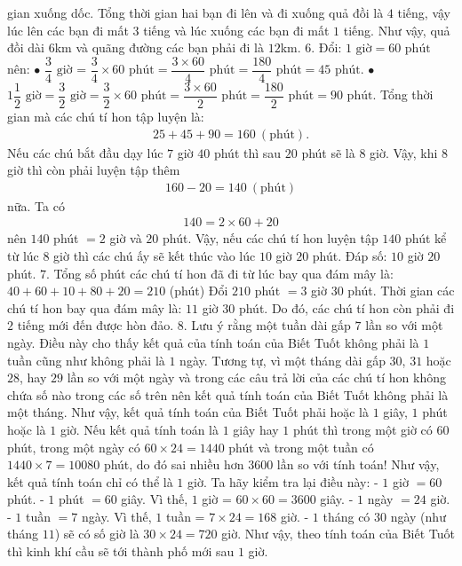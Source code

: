 gian xuống dốc. Tổng thời gian hai bạn đi lên và đi xuống quả đồi là $4$ tiếng, vậy lúc lên các bạn đi mất $3$ tiếng và lúc xuống các bạn đi mất $1$ tiếng.
Như vậy, quả đồi dài 6km và quãng đường các bạn phải đi là $12$km.
\vskip 0.1cm
6. Đổi: $1 \mbox{ giờ} = 60 \mbox{ phút}$ nên: 
\vskip 0.1cm
$\bullet$ $\dfrac{3}{4} \mbox{ giờ}$ = $\dfrac{3}{4}\times 60 \mbox{ phút}= \dfrac{3\times 60}{4}  \mbox{ phút}= \dfrac{180}{4}  \mbox{ phút}= 45 \mbox{ phút}.$ 
\vskip 0.1cm
$\bullet$ $1\dfrac{1}{2} \mbox{ giờ}= \dfrac{3}{2} \mbox{ giờ} = \dfrac{3}{2}\times 60  \mbox{ phút}= \dfrac{3\times 60}{2}  \mbox{ phút}= \dfrac{180}{2}  \mbox{ phút}= 90 \mbox{ phút}.$
\vskip 0.1cm
Tổng thời gian mà các chú tí hon tập luyện là:
\begin{align*}
	25 + 45 + 90= 160 \ (\textrm{phút}).
\end{align*}
Nếu các chú bắt đầu dạy lúc $7$ giờ $40$ phút thì sau $20$ phút sẽ là $8$ giờ. Vậy, khi $8$ giờ thì còn phải luyện tập thêm
\begin{align*}
	160-20=140\ (\textrm{phút})
\end{align*}
nữa. Ta có 
\begin{align*}
	140= 2\times 60 +20
\end{align*}
nên $140$ phút $=2$ giờ và $20$ phút. Vậy, nếu các chú tí hon luyện tập $140$ phút kể từ lúc $8$ giờ thì các chú ấy sẽ kết thúc vào lúc  $10$ giờ $20$ phút.
\vskip 0.1cm
Đáp số: $10$ giờ $20$ phút.
\vskip 0.1cm
$7.$
\vskip 0.1cm
Tổng số phút các chú tí hon đã đi từ lúc bay qua đám mây là:
\vskip 0.1cm
$40 + 60 + 10 + 80 + 20 = 210$ (phút)
\vskip 0.1cm
Đổi $210$ phút  $= 3$ giờ $30$ phút.
\vskip 0.1cm
Thời gian các chú tí hon bay qua đám mây là: $11$ giờ $30$ phút. Do đó, các chú tí hon còn phải đi $2$ tiếng mới đến được hòn đảo.
\vskip 0.1cm
$8.$ 
\vskip 0.1cm
Lưu ý rằng một tuần dài gấp $7$ lần so với một ngày. Điều này cho thấy kết quả của tính toán của Biết Tuốt không phải là $1$ tuần cũng như không phải là $1$ ngày. Tương tự, vì một tháng dài gấp $30$, $31$ hoặc $28$, hay $29$ lần so với một ngày và trong các câu trả lời của các chú tí hon không chứa số nào trong các số trên nên kết quả tính toán của Biết Tuốt không phải là một tháng. Như vậy, kết quả tính toán của Biết Tuốt phải hoặc là $1$ giây, $1$ phút hoặc là $1$ giờ. Nếu kết quả tính toán là $1$ giây hay $1$ phút thì trong một giờ có $60$ phút, trong một ngày có $60 \times 24 = 1440$ phút và trong một tuần có $1440\times 7 = 10080$ phút, do đó sai nhiều hơn $3600$ lần so với tính toán! Như vậy, kết quả tính toán chỉ có thể là $1$ giờ. Ta hãy kiểm tra lại điều này: - $1$ giờ $= 60$ phút. - $1$ phút $= 60$ giây. Vì thế, $1$ giờ = $60\times 60 = 3600$ giây. - $1$ ngày $= 24$ giờ. - $1$ tuần $= 7$ ngày. Vì thế, $1$ tuần = $7\times 24 = 168$ giờ. - $1$ tháng có $30$ ngày (như tháng $11$) sẽ có số giờ là $30\times 24 = 720$ giờ. Như vậy, theo tính toán của Biết Tuốt thì kinh khí cầu sẽ tới thành phố mới sau $1$ giờ.

